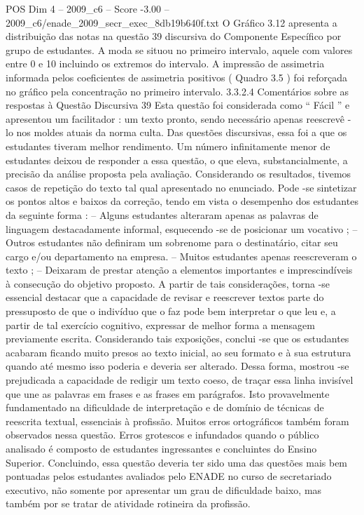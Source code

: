 \begin{textsample}{POS Dim 4 – 2009\_c6 – Score -3.00 – 2009\_c6/enade\_2009\_secr\_exec\_8db19b640f.txt}
O Gráfico 3.12 apresenta a distribuição das notas na questão 39 discursiva do Componente Específico por grupo de estudantes.
A moda se situou no primeiro intervalo, aquele com valores entre 0 e 10 incluindo os extremos do intervalo.
A impressão de assimetria informada pelos coeficientes de assimetria positivos ( Quadro 3.5 ) foi reforçada no gráfico pela concentração no primeiro intervalo. 3.3.2.4 Comentários sobre as respostas à Questão Discursiva 39 Esta questão foi considerada como “ Fácil ” e apresentou um facilitador : um texto pronto, sendo necessário apenas reescrevê -lo nos moldes atuais da norma culta.
Das questões discursivas, essa foi a que os estudantes tiveram melhor rendimento.
Um número infinitamente menor de estudantes deixou de responder a essa questão, o que eleva, substancialmente, a precisão da análise proposta pela avaliação.
Considerando os resultados, tivemos casos de repetição do texto tal qual apresentado no enunciado.
Pode -se sintetizar os pontos altos e baixos da correção, tendo em vista o desempenho dos estudantes da seguinte forma : – Alguns estudantes alteraram apenas as palavras de linguagem destacadamente informal, esquecendo -se de posicionar um vocativo ; – Outros estudantes não definiram um sobrenome para o destinatário, citar seu cargo e/ou departamento na empresa. – Muitos estudantes apenas reescreveram o texto ; – Deixaram de prestar atenção a elementos importantes e imprescindíveis à consecução do objetivo proposto.
A partir de tais considerações, torna -se essencial destacar que a capacidade de revisar e reescrever textos parte do pressuposto de que o indivíduo que o faz pode bem interpretar o que leu e, a partir de tal exercício cognitivo, expressar de melhor forma a mensagem previamente escrita.
Considerando tais exposições, conclui -se que os estudantes acabaram ficando muito presos ao texto inicial, ao seu formato e à sua estrutura quando até mesmo isso poderia e deveria ser alterado.
Dessa forma, mostrou -se prejudicada a capacidade de redigir um texto coeso, de traçar essa linha invisível que une as palavras em frases e as frases em parágrafos.
Isto provavelmente fundamentado na dificuldade de interpretação e de domínio de técnicas de reescrita textual, essenciais à profissão.
Muitos erros ortográficos também foram observados nessa questão.
Erros grotescos e infundados quando o público analisado é composto de estudantes ingressantes e concluintes do Ensino Superior.
Concluindo, essa questão deveria ter sido uma das questões mais bem pontuadas pelos estudantes avaliados pelo ENADE no curso de secretariado executivo, não somente por apresentar um grau de dificuldade baixo, mas também por se tratar de atividade rotineira da profissão.

\end{textsample}
